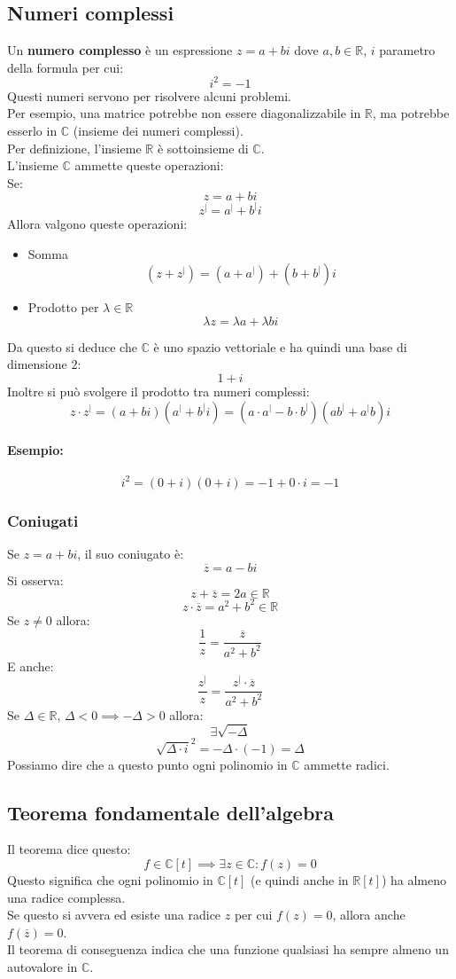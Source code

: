 \documentclass[12pt,a4paper]{article}
\begin{document}
\subsection{Numeri complessi}
Un \textbf{numero complesso} è un espressione $z = a + bi$ dove $a,b \in \mathbb{R}$, $i$ parametro della formula per cui:
\[
i^2 = -1
\]
Questi numeri servono per risolvere alcuni problemi.\\
Per esempio, una matrice potrebbe non essere diagonalizzabile in $\mathbb{R}$, ma potrebbe esserlo in $\mathbb{C}$ (insieme dei numeri complessi).\\
Per definizione, l'insieme $\mathbb{R}$ è sottoinsieme di $\mathbb{C}$.\\
L'insieme $\mathbb{C}$ ammette queste operazioni:\\
Se:
\[
z = a + bi
\]
\[
z^| = a^| + b^|i
\]
Allora valgono queste operazioni:
\begin{itemize}
  \item Somma
  \[
  (z + z^|) = (a + a^|) + (b + b^|)i
  \]
  \item Prodotto per $\lambda \in \mathbb{R}$
  \[
  \lambda z = \lambda a + \lambda bi
  \]
\end{itemize}
Da questo si deduce che $\mathbb{C}$ è uno spazio vettoriale e ha quindi una base di dimensione $2$:
\[
1 + i
\]
Inoltre si può svolgere il prodotto tra numeri complessi:
\[
z \cdot z^| = (a + bi)(a^| + b^|i) = (a \cdot a^| - b \cdot b^|)(ab^| + a^|b)i
\]
\paragraph{Esempio:}
\[
i^2 = (0 + i)(0 + i) = -1 + 0 \cdot i = -1
\]
\subsubsection{Coniugati}
Se $z = a + bi$, il suo coniugato è:
\[
\overline{z} = a - bi
\]
Si osserva:
\[
z + \overline{z} = 2a \in \mathbb{R}
\]
\[
z \cdot \overline{z} = a^2 + b^2 \in \mathbb{R}
\]
Se $z \ne 0$ allora:
\[
\frac{1}{z} = \frac{\overline{z}}{a^2 + b^2}
\]
E anche:
\[
\frac{z^|}{z} = \frac{z^| \cdot \overline{z}}{a^2 + b^2}
\]
Se $\Delta \in \mathbb{R}$, $\Delta < 0 \implies -\Delta > 0$ allora:
\[
\exists \sqrt{-\Delta}
\]
\[
\sqrt{\Delta \cdot i}^2 = -\Delta \cdot (-1) = \Delta
\]
Possiamo dire che a questo punto ogni polinomio in $\mathbb{C}$ ammette radici.\\
\subsection{Teorema fondamentale dell'algebra}
Il teorema dice questo:
\[
f \in \mathbb{C}[t] \implies \exists z \in \mathbb{C} : f(z) = 0
\]
Questo significa che ogni polinomio in $\mathbb{C}[t]$ (e quindi anche in $\mathbb{R}[t]$) ha almeno una radice complessa.\\
Se questo si avvera ed esiste una radice $z$ per cui $f(z) = 0$, allora anche $f(\overline{z}) = 0$.\\
Il teorema di conseguenza indica che una funzione qualsiasi ha sempre almeno un autovalore in $\mathbb{C}$.
\end{document}
